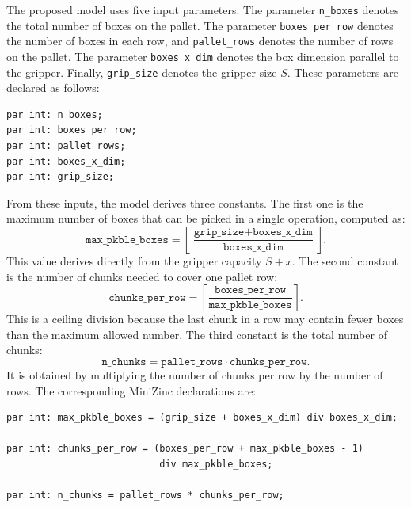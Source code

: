 The proposed model uses five input parameters. The parameter
\texttt{n\_boxes} denotes the total number of boxes on the pallet.
The parameter \texttt{boxes\_per\_row} denotes the number of boxes in each
row, and \texttt{pallet\_rows} denotes the number of rows on the pallet.
The parameter \texttt{boxes\_x\_dim} denotes the box dimension parallel to
the gripper. Finally, \texttt{grip\_size} denotes the gripper size \(S\). These
parameters are declared as follows:
\vspace{0.5cm}
\begin{lstlisting}
par int: n_boxes;
par int: boxes_per_row;
par int: pallet_rows;
par int: boxes_x_dim;
par int: grip_size;
\end{lstlisting}
\vspace{0.5cm}
From these inputs, the model derives three constants. The first one is the
maximum number of boxes that can be picked in a single operation, computed as:
\[
    \texttt{max\_pkble\_boxes}
    =
    \left\lfloor
    \frac{\texttt{grip\_size} + \texttt{boxes\_x\_dim}}
         {\texttt{boxes\_x\_dim}}
    \right\rfloor .
\]
This value derives directly from the gripper capacity \(S+x\). The second
constant is the number of chunks needed to cover one pallet row:
\[
    \texttt{chunks\_per\_row}
    =
    \left\lceil
    \frac{\texttt{boxes\_per\_row}}
         {\texttt{max\_pkble\_boxes}}
    \right\rceil .
\]
This is a ceiling division because the last chunk in a row may contain fewer
boxes than the maximum allowed number. The third constant is the total number of chunks:
\[
    \texttt{n\_chunks}
    =
    \texttt{pallet\_rows}
    \cdot
    \texttt{chunks\_per\_row}.
\]
It is obtained by multiplying the number of chunks per row by the number of
rows. The corresponding MiniZinc declarations are:
\vspace{0.5cm}
\begin{lstlisting}
par int: max_pkble_boxes = (grip_size + boxes_x_dim) div boxes_x_dim;

par int: chunks_per_row = (boxes_per_row + max_pkble_boxes - 1)
                           div max_pkble_boxes;

par int: n_chunks = pallet_rows * chunks_per_row;
\end{lstlisting}